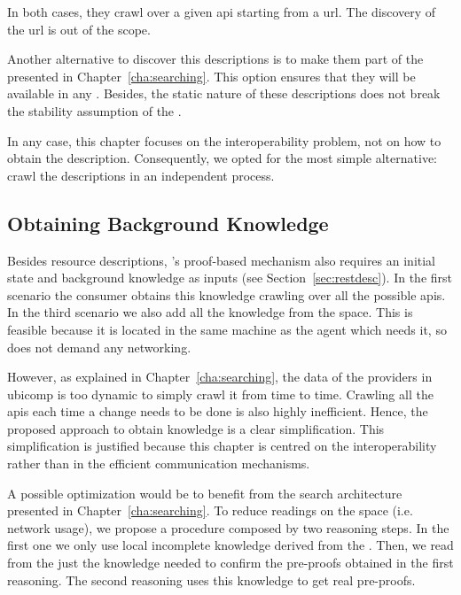 In both cases, they crawl over a given \ac{api} starting from a \ac{url}.
The discovery of the \ac{url} is out of the scope.


Another alternative to discover this descriptions is to make them part of the \clues{} presented in Chapter~\ref{cha:searching}.
This option ensures that they will be available in any \consumer{}.
Besides, the static nature of these descriptions does not break the stability assumption of the \clues{}. %


In any case, this chapter focuses on the interoperability problem, not on how to obtain the description.
Consequently, we opted for the most simple alternative: crawl the descriptions in an independent process. %



\subsection{Obtaining Background Knowledge}

Besides resource descriptions, \citeauthor{verborgh_ijcs_2014}'s proof-based mechanism also requires an initial state and background knowledge as inputs (see Section~\ref{sec:restdesc}).
In the first scenario the consumer obtains this knowledge crawling over all the possible \acsp{api}.
In the third scenario we also add all the knowledge from the space.
This is feasible because it is located in the same machine as the agent which needs it, so does not demand any networking. %


However, as explained in Chapter~\ref{cha:searching}, the data of the providers in \ac{ubicomp} is too dynamic to simply crawl it from time to time.
Crawling all the \acsp{api} each time a change needs to be done is also highly inefficient.
Hence, the proposed approach to obtain knowledge is a clear simplification.
This simplification is justified because this chapter is centred on the interoperability rather than in the efficient communication mechanisms.


\bigskip


A possible optimization would be to benefit from the search architecture presented in Chapter~\ref{cha:searching}.
To reduce readings on the space (i.e. network usage), we propose a procedure composed by two reasoning steps.
In the first one we only use local incomplete knowledge derived from the \clues{}.
Then, we read from the \Space{} just the knowledge needed to confirm the pre-proofs obtained in the first reasoning.
The second reasoning uses this knowledge to get real pre-proofs. %


